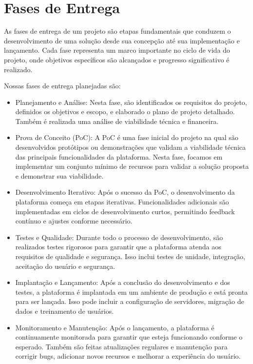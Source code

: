 \section{Fases de Entrega}

As fases de entrega de um projeto são etapas fundamentais que conduzem o desenvolvimento de uma solução desde sua concepção até sua implementação e lançamento. Cada fase representa um marco importante no ciclo de vida do projeto, onde objetivos específicos são alcançados e progresso significativo é realizado.

Nossas fases de entrega planejadas são:

\begin{itemize}
\item Planejamento e Análise:
Nesta fase, são identificados os requisitos do projeto, definidos os objetivos e escopo, e elaborado o plano de projeto detalhado. Também é realizada uma análise de viabilidade técnica e financeira.

\item Prova de Conceito (PoC):
A PoC é uma fase inicial do projeto na qual são desenvolvidos protótipos ou demonstrações que validam a viabilidade técnica das principais funcionalidades da plataforma. Nesta fase, focamos em implementar um conjunto mínimo de recursos para validar a solução proposta e demonstrar sua viabilidade.

\item Desenvolvimento Iterativo:
Após o sucesso da PoC, o desenvolvimento da plataforma começa em etapas iterativas. Funcionalidades adicionais são implementadas em ciclos de desenvolvimento curtos, permitindo feedback contínuo e ajustes conforme necessário.

\item Testes e Qualidade:
Durante todo o processo de desenvolvimento, são realizados testes rigorosos para garantir que a plataforma atenda aos requisitos de qualidade e segurança. Isso inclui testes de unidade, integração, aceitação do usuário e segurança.

\item Implantação e Lançamento:
Após a conclusão do desenvolvimento e dos testes, a plataforma é implantada em um ambiente de produção e está pronta para ser lançada. Isso pode incluir a configuração de servidores, migração de dados e treinamento de usuários.

\item Monitoramento e Manutenção:
Após o lançamento, a plataforma é continuamente monitorada para garantir que esteja funcionando conforme o esperado. Também são feitas atualizações regulares e manutenção para corrigir bugs, adicionar novos recursos e melhorar a experiência do usuário.

\end{itemize}


